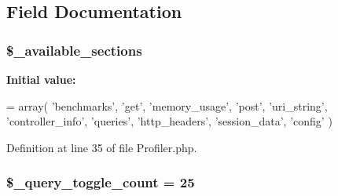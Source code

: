 \subsection{Field Documentation}
\hypertarget{class_c_i___profiler_ae30756727f63d3be7422d378676f667d}{
\subsubsection[{\$\-\_\-available\-\_\-sections}]{\setlength{\rightskip}{0pt plus 5cm}\$\-\_\-available\-\_\-sections\hspace{0.3cm}{\ttfamily [protected]}}}\label{class_c_i___profiler_ae30756727f63d3be7422d378676f667d}
{\bfseries Initial value\-:}
\begin{DoxyCode}
= array(
                                        \textcolor{stringliteral}{'benchmarks'},
                                        \textcolor{stringliteral}{'get'},
                                        \textcolor{stringliteral}{'memory\_usage'},
                                        \textcolor{stringliteral}{'post'},
                                        \textcolor{stringliteral}{'uri\_string'},
                                        \textcolor{stringliteral}{'controller\_info'},
                                        \textcolor{stringliteral}{'queries'},
                                        \textcolor{stringliteral}{'http\_headers'},
                                        \textcolor{stringliteral}{'session\_data'},
                                        \textcolor{stringliteral}{'config'}
                                        )
\end{DoxyCode}


Definition at line 35 of file Profiler.\-php.

\hypertarget{class_c_i___profiler_a950aa6662ddde22ba9c05adffd6a20c9}{
\subsubsection[{\$\-\_\-query\-\_\-toggle\-\_\-count}]{\setlength{\rightskip}{0pt plus 5cm}\$\-\_\-query\-\_\-toggle\-\_\-count = 25\hspace{0.3cm}{\ttfamily [protected]}}}\label{class_c_i___profiler_a950aa6662ddde22ba9c05adffd6a20c9}


